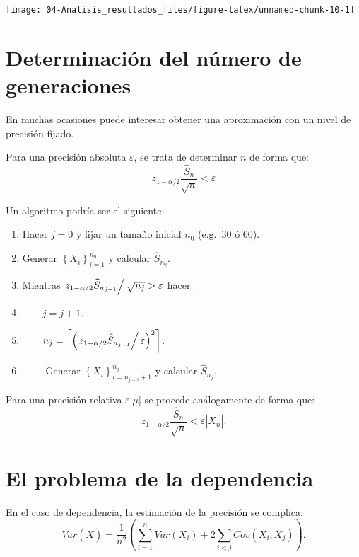 \documentclass[]{book}
\theoremstyle{definition}
\theoremstyle{definition}
\theoremstyle{definition}
\theoremstyle{remark}
\begin{document}
\begin{center}\texttt{[image: 04-Analisis\_resultados\_files/figure-latex/unnamed-chunk-10-1]} \end{center}

\section{Determinación del número de
generaciones}\label{determinacion-del-numero-de-generaciones}

En muchas ocasiones puede interesar obtener una aproximación con un
nivel de precisión fijado.

Para una precisión absoluta \(\varepsilon\), se trata de determinar
\(n\) de forma que:
\[z_{1-\alpha /2}\dfrac{\widehat{S}_{n}}{\sqrt{n}}<\varepsilon\]

Un algoritmo podría ser el siguiente:

\begin{enumerate}
\def\labelenumi{\arabic{enumi}.}
\item
  Hacer \(j=0\) y fijar un tamaño inicial \(n_{0}\) (e.g.~30 ó 60).
\item
  Generar \(\left\{ X_{i}\right\} _{i=1}^{n_{0}}\) y calcular
  \(\widehat{S}_{n_{0}}\).
\item
  Mientras
  \(\left. z_{1-\alpha /2}\widehat{S}_{n_{j-1}}\right/ \sqrt{n_{j}}>\varepsilon\)
  hacer:
\item
  \(\qquad j=j+1\).
\item
  \(\qquad n_{j}=\left\lceil \left( \left. z_{1-\alpha /2}\widehat{S}  _{n_{j-1}}\right/ \varepsilon \right)^{2}\right\rceil\).
\item
  \(\qquad\) Generar \(\left\{ X_{i}\right\}  _{i=n_{j-1}+1}^{n_{j}}\) y
  calcular \(\widehat{S}_{n_{j}}\).
\end{enumerate}

Para una precisión relativa \(\varepsilon \left\vert \mu \right\vert\)
se procede análogamente de forma
que:\[z_{1-\alpha /2}\dfrac{\widehat{S}_{n}}{\sqrt{n}}<\varepsilon \left\vert 
\overline{X}_{n}\right\vert .\]

\section{El problema de la
dependencia}\label{el-problema-de-la-dependencia}

En el caso de dependencia, la estimación de la precisión se complica:
\[Var\left( \overline{X}\right) =\frac{1}{n^{2}}\left( 
\sum_{i=1}^{n}Var\left( X_{i} \right) + 2\sum_{i<j}Cov\left( X_{i},X_{j}\right) \right).\]
\end{document}
